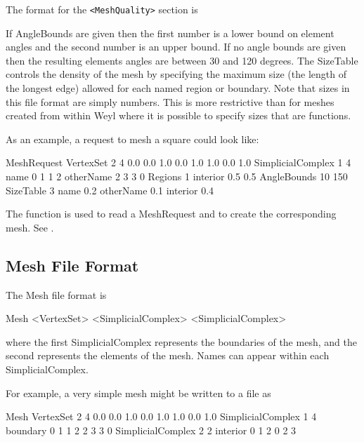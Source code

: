 The format for the \verb+<MeshQuality>+ section is

\begin{code}
\end{code}
\noindent
If AngleBounds are given then the first number is a lower bound on
element angles and the second number is an upper bound.  If no angle
bounds are given then the resulting elements angles are between 30 and
120 degrees.  The SizeTable controls the density of the mesh by
specifying the maximum size (the length of the longest edge) allowed
for each named region or boundary.  Note that sizes in this file
format are simply numbers.  This is more restrictive than for meshes
created from within Weyl where it is possible to specify sizes that
are functions.

As an example, a request to mesh a square could look like:

\begin{code}
MeshRequest
VertexSet 2 4
0.0 0.0
1.0 0.0
1.0 1.0
0.0 1.0
SimplicialComplex 1 4
name
0 1 
1 2 
otherName
2 3  
3 0
Regions 1
interior
0.5 0.5
AngleBounds 10 150
SizeTable 3
name 0.2
otherName 0.1
interior 0.4
\end{code}

The function  is used to read a
MeshRequest and to create the corresponding mesh.  See
.

\subsection{Mesh File Format}

The Mesh file format is

\begin{code}
Mesh
<VertexSet>
<SimplicialComplex> 
<SimplicialComplex>
\end{code}
\noindent
where the first SimplicialComplex represents the boundaries of the
mesh, and the second represents the elements of the mesh.  Names can
appear within each SimplicialComplex.

For example, a very simple mesh might be written to a file as

\begin{code}
Mesh
VertexSet 2 4
0.0 0.0
1.0 0.0
1.0 1.0
0.0 1.0
SimplicialComplex 1 4
boundary
0 1
1 2
2 3
3 0
SimplicialComplex 2 2
interior
0 1 2
0 2 3
\end{code}

